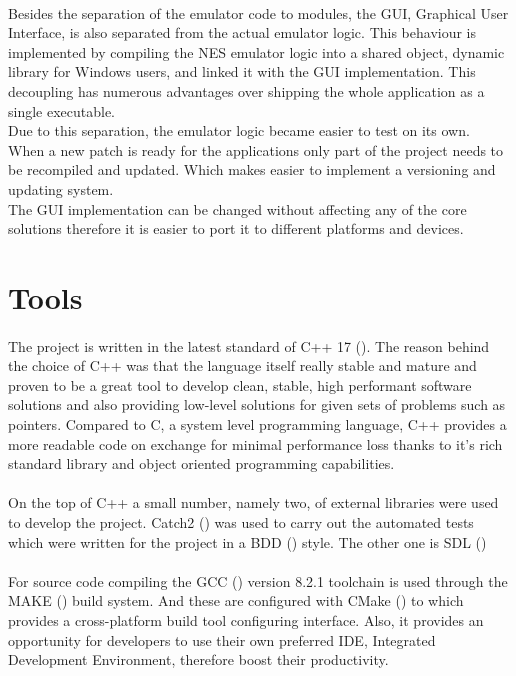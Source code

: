 \documentclass[]{report}
\begin{document}
\paragraph{ }
Besides the separation of the emulator code to modules, the GUI, Graphical User Interface,  is also separated from the actual emulator logic. This behaviour is implemented by compiling the NES emulator logic into a shared object, dynamic library for Windows users, and linked it with the GUI implementation. This decoupling has numerous advantages over shipping the whole application as a single executable.
\\ 
Due to this separation, the emulator logic became easier to test on its own. 
\\ 
When a new patch is ready for the applications only part of the project needs to be recompiled and updated. Which makes easier to implement a versioning and updating system.
\\ 
The GUI implementation can be changed without affecting any of the core solutions therefore it is easier to port it to different platforms and devices.

\section{Tools}
\paragraph{ }
The project is written in the latest standard of C++ 17 (\cite{CPPV}). The reason behind the choice of C++ was that the language itself really stable and mature and proven to be a great tool to develop clean, stable, high performant software solutions and also providing low-level solutions for given sets of problems such as pointers. Compared to C, a system level programming language, C++ provides a more readable code on exchange for minimal performance loss thanks to it's rich standard library and object oriented programming capabilities.

\paragraph{ }
On the top of C++ a small number, namely two, of external libraries were used to develop the project.
Catch2 (\cite{CTCH}) was used to carry out the automated tests which were written for the project in a BDD (\cite{BDDT}) style.
The other one is SDL (\cite{SDL2})

\paragraph{ }
For source code compiling the GCC (\cite{GCCV}) version 8.2.1 toolchain is used through the MAKE (\cite{MAKE}) build system. And these are configured with CMake (\cite{CMKE}) to which provides a cross-platform build tool configuring interface. Also, it provides an opportunity for developers to use their own preferred IDE, Integrated Development Environment, therefore boost their productivity.
\end{document}
